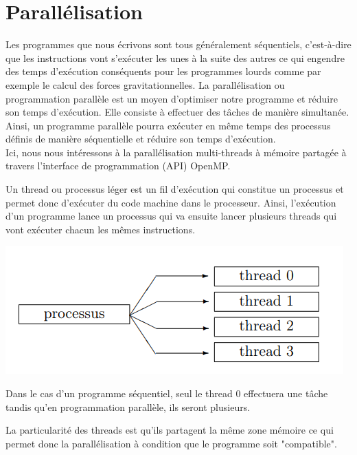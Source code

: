 \chapter{Parallélisation }
Les programmes que nous écrivons sont tous généralement séquentiels, c'est-à-dire que les instructions vont s'exécuter les unes à la suite des autres ce qui engendre des temps d'exécution conséquents pour les programmes lourds comme par exemple le calcul des forces gravitationnelles.
La parallélisation ou programmation parallèle est un moyen d'optimiser notre programme et réduire son temps d'exécution. 
Elle consiste à effectuer des tâches de manière simultanée. Ainsi, un programme parallèle pourra exécuter en même temps des processus définis de manière séquentielle et réduire son temps d'exécution.\\

Ici, nous nous intéressons à la parallélisation multi-threads à mémoire partagée à travers l'interface de programmation (API) OpenMP.

Un thread ou processus léger est un fil d'exécution qui constitue un processus et permet donc d'exécuter du code machine dans le processeur. Ainsi, l'exécution d'un programme lance un processus qui va ensuite lancer plusieurs threads qui vont exécuter chacun les mêmes instructions.


\begin{center}
\includegraphics[scale=0.8]{images/process_thread.png}
\captionsetup{hypcap=false}
\label{fig10}

\end{center} 

Dans le cas d'un programme séquentiel, seul le thread 0 effectuera une tâche tandis qu'en programmation parallèle, ils seront plusieurs.

La particularité des threads est qu'ils partagent la même zone mémoire ce qui permet donc la parallélisation à condition que le programme soit "compatible".

